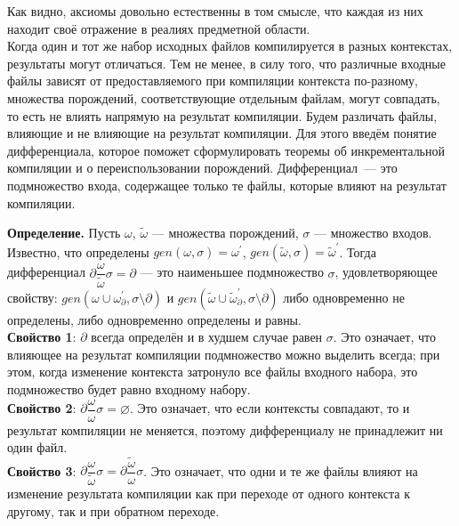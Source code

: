 Как видно, аксиомы довольно естественны в том смысле, что каждая из них находит своё отражение в реалиях предметной области.\\


Когда один и тот же набор исходных файлов компилируется в разных контекстах, результаты могут отличаться. Тем не менее, в силу того, что различные входные файлы зависят от предоставляемого при компиляции контекста по-разному, множества порождений, соответствующие отдельным файлам, могут совпадать, то есть не влиять напрямую на результат компиляции. Будем различать файлы, влияющие и не влияющие на результат компиляции. Для этого введём понятие дифференциала, которое поможет сформулировать теоремы об инкрементальной компиляции и о переиспользовании порождений. Дифференциал~--- это подмножество входа, содержащее только те файлы, которые влияют на результат компиляции.

\textbf{Определение.} Пусть $\omega$, $\tilde{\omega}$ --- множества порождений, $\sigma$ --- множество входов. Известно, что определены $gen(\omega, \sigma) = \omega^\prime$, $gen(\tilde{\omega}, \sigma) = \tilde{\omega}^\prime$. Тогда дифференциал $\partial\dfrac{\omega}{\tilde{\omega}}\sigma = \partial$ --- это наименьшее подмножество $\sigma$, удовлетворяющее свойству: 
$gen(\omega \cup \omega^\prime_{\partial}, \sigma\setminus\partial)$ и
$gen(\tilde{\omega} \cup \tilde{\omega}^\prime_{\partial}, \sigma\setminus\partial)$ либо одновременно не определены, либо одновременно определены и равны.\\

\textbf{Свойство 1}: $\partial$ всегда определён и в худшем случае равен $\sigma$. Это означает, что влияющее на результат компиляции подмножество можно выделить всегда; при этом, когда изменение контекста затронуло все файлы входного набора, это подмножество будет равно входному набору.\\

\textbf{Свойство 2}: $\partial\dfrac{\omega}{\omega}\sigma = \varnothing$. Это означает, что если контексты совпадают, то и результат компиляции не меняется, поэтому дифференциалу не принадлежит ни один файл.\\

\textbf{Свойство 3}: $\partial\dfrac{\omega}{\tilde{\omega}}\sigma = \partial\dfrac{\tilde{\omega}}{\omega}\sigma$. Это означает, что одни и те же файлы влияют на изменение результата компиляции как при переходе от одного контекста к другому, так и при обратном переходе.\\


